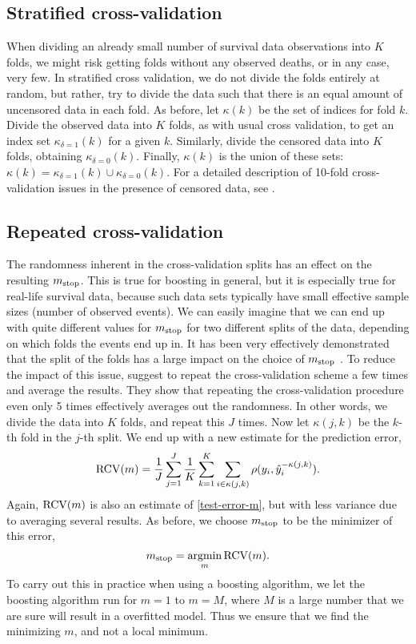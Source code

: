 \subsection{Stratified cross-validation}
When dividing an already small number of survival data observations into $K$ folds, we might risk getting folds without any observed deaths, or in any case, very few. In stratified cross validation, we do not divide the folds entirely at random, but rather, try to divide the data such that there is an equal amount of uncensored data in each fold.
As before, let $\kappa(k)$ be the set of indices for fold $k$.
Divide the observed data into $K$ folds, as with usual cross validation, to get an index set $\kappa_{\delta=1}(k)$ for a given $k$. 
Similarly, divide the censored data into $K$ folds, obtaining $\kappa_{\delta=0}(k)$.
Finally, $\kappa(k)$ is the union of these sets: $\kappa(k)=\kappa_{\delta=1}(k)\cup\kappa_{\delta=0}(k)$.
For a detailed description of 10-fold cross-validation issues in the presence of censored data, see \citet{kohavi}.

\subsection{Repeated cross-validation}\label{subsec:repeated-cv}
The randomness inherent in the cross-validation splits has an effect on the resulting $m_{\text{stop}}$.
This is true for boosting in general, but it is especially true for real-life survival data, because such data sets typically have small effective sample sizes (number of observed events).
We can easily imagine that we can end up with quite different values for $m_{\text{stop}}$ for two different splits of the data, depending on which folds the events end up in.
It has been very effectively demonstrated that the split of the folds has a large impact on the choice of $m_{\text{stop}}$ \citep{seibold}.
To reduce the impact of this issue, \citet{seibold} suggest to repeat the cross-validation scheme a few times and average the results.
They show that repeating the cross-validation procedure even only 5 times effectively averages out the randomness.
In other words, we divide the data into $K$ folds, and repeat this $J$ times.
Now let $\kappa(j, k)$ be the $k$-th fold in the $j$-th split.
We end up with a new estimate for the prediction error,
\begin{equation*}
    \operatorname{RCV}(m)=\frac{1}{J}\sum_{j=1}^J\frac{1}{K}\sum_{k=1}^K\sum_{i\in\kappa(j,k)}\rho(y_i,\hat{y}_i^{-\kappa(j,k)}).
\end{equation*}
Again, $\operatorname{RCV}(m)$ is also an estimate of \eqref{test-error-m}, but with less variance due to averaging several results.
As before, we choose $m_{\text{stop}}$ to be the minimizer of this error,
\begin{equation*}
    m_{\text{stop}}=\operatorname*{argmin}_{m}\operatorname{RCV}(m).
\end{equation*}
To carry out this in practice when using a boosting algorithm, we let the boosting algorithm run for $m=1$ to $m=M$, where $M$ is a large number that we are sure will result in a overfitted model.
Thus we ensure that we find the minimizing $m$, and not a local minimum.

